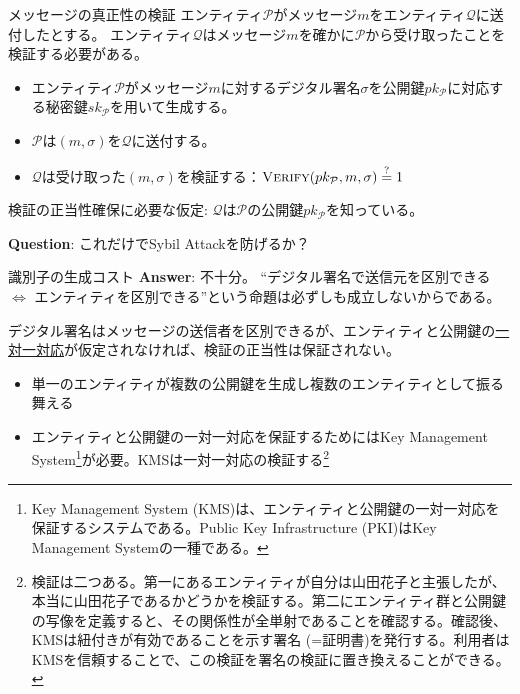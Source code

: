 \documentclass[aspectratio=169,10pt]{beamer}
\newenvironment{outlineblock}[1][]
{\begin{tcolorbox}[colframe=black, colback=white, boxrule=1pt, boxsep=5pt]}
{\end{tcolorbox}}
\begin{document}
\begin{frame}{メッセージの真正性の検証}
エンティティ$\mathcal{P}$がメッセージ$m$をエンティティ$\mathcal{Q}$に送付したとする。
エンティティ$\mathcal{Q}$はメッセージ$m$を確かに$\mathcal{P}$から受け取ったことを検証する必要がある。

\vspace{0.5em}

\begin{itemize}
    \item エンティティ$\mathcal{P}$がメッセージ$m$に対するデジタル署名$\sigma$を公開鍵$pk_{\mathcal{P}}$に対応する秘密鍵$sk_{\mathcal{P}}$を用いて生成する。
    \item $\mathcal{P}$は$(m, \sigma)$を$\mathcal{Q}$に送付する。
    \item $\mathcal{Q}$は受け取った$(m, \sigma)$を検証する：$\textsc{Verify}(pk_{\mathcal{P}}, m, \sigma) \stackrel{?}{=} 1$
\end{itemize}

\begin{outlineblock}[デジタル署名を用いたメッセージの真正性の検証に必要な仮定]
    検証の正当性確保に必要な仮定: $\mathcal{Q}$は$\mathcal{P}$の公開鍵$pk_{\mathcal{P}}$を知っている。
\end{outlineblock}

\textbf{Question}: これだけでSybil Attackを防げるか？

\end{frame}



\begin{frame}{識別子の生成コスト}
\textbf{Answer}: 不十分。
``デジタル署名で送信元を区別できる $\Leftrightarrow$ エンティティを区別できる''という命題は必ずしも成立しないからである。

\begin{outlineblock}
    デジタル署名はメッセージの送信者を区別できるが、エンティティと公開鍵の\underline{一対一対応}が仮定されなければ、検証の正当性は保証されない。
\end{outlineblock}

\begin{itemize}
    \item 単一のエンティティが複数の公開鍵を生成し複数のエンティティとして振る舞える
    \item エンティティと公開鍵の一対一対応を保証するためにはKey Management System\footnote{Key Management System (KMS)は、エンティティと公開鍵の一対一対応を保証するシステムである。Public Key Infrastructure (PKI)はKey Management Systemの一種である。}が必要。KMSは一対一対応の検証する\footnote{検証は二つある。第一にあるエンティティが自分は山田花子と主張したが、本当に山田花子であるかどうかを検証する。第二にエンティティ群と公開鍵の写像を定義すると、その関係性が全単射であることを確認する。確認後、KMSは紐付きが有効であることを示す署名 (=証明書)を発行する。利用者はKMSを信頼することで、この検証を署名の検証に置き換えることができる。}
\end{itemize}
\end{frame}
\end{document}
